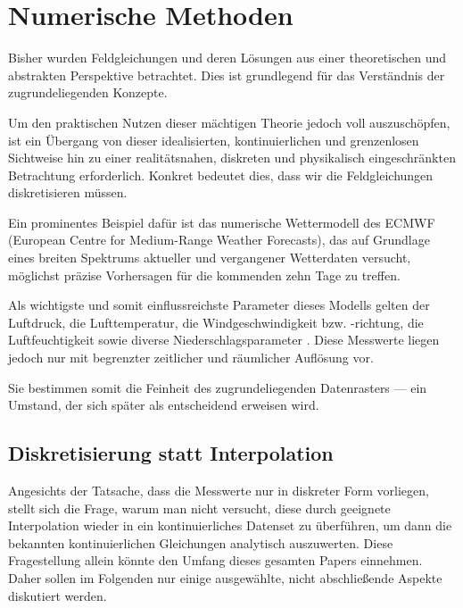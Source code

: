 %
%
%
%
\section{Numerische Methoden}

Bisher wurden Feldgleichungen und deren Lösungen aus einer theoretischen und abstrakten Perspektive betrachtet.
Dies ist grundlegend für das Verständnis der zugrundeliegenden Konzepte.

Um den praktischen Nutzen dieser mächtigen Theorie jedoch voll auszuschöpfen, ist ein Übergang von dieser idealisierten, kontinuierlichen und grenzenlosen Sichtweise hin zu einer realitätsnahen, diskreten und physikalisch eingeschränkten Betrachtung erforderlich.
Konkret bedeutet dies, dass wir die Feldgleichungen diskretisieren müssen.

Ein prominentes Beispiel dafür ist das numerische Wettermodell des ECMWF (European Centre for Medium-Range Weather Forecasts), das auf Grundlage eines breiten Spektrums aktueller und vergangener Wetterdaten versucht, möglichst präzise Vorhersagen für die kommenden zehn Tage zu treffen.

Als wichtigste und somit einflussreichste Parameter dieses Modells gelten der Luftdruck, die Lufttemperatur, die Windgeschwindigkeit bzw. -richtung, die Luftfeuchtigkeit sowie diverse Niederschlagsparameter \cite{ecmwf2023}.
Diese Messwerte liegen jedoch nur mit begrenzter zeitlicher und räumlicher Auflösung vor.

Sie bestimmen somit die Feinheit des zugrundeliegenden Datenrasters --- ein Umstand, der sich später als entscheidend erweisen wird.

\subsection{Diskretisierung statt Interpolation}

Angesichts der Tatsache, dass die Messwerte nur in diskreter Form vorliegen, stellt sich die Frage, warum man nicht versucht, diese durch geeignete Interpolation wieder in ein kontinuierliches Datenset zu überführen, um dann die bekannten kontinuierlichen Gleichungen analytisch auszuwerten.
Diese Fragestellung allein könnte den Umfang dieses gesamten Papers einnehmen.
Daher sollen im Folgenden nur einige ausgewählte, nicht abschließende Aspekte diskutiert werden.


